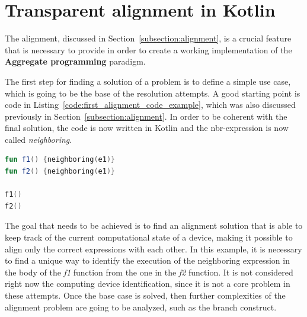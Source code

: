 \chapter{Transparent alignment in Kotlin}\label{chapter:alignment}
The alignment, discussed in Section~\ref{subsection:alignment}, is a crucial feature that is necessary to provide in order to create a working implementation of the \textbf{Aggregate programming} paradigm. 

The first step for finding a solution of a problem is to define a simple use case, which is going to be the base of the resolution attempts. A good starting point is code in Listing~\ref{code:first_alignment_code_example}, which was also discussed previously in Section~\ref{subsection:alignment}. In order to be coherent with the final solution, the code is now written in Kotlin and the nbr-expression is now called \textit{neighboring}.
\begin{lstlisting}[caption={Starting point code to resolve the alignment problem}, captionpos=b, language=Kotlin, label={code:first_alignment_code_example}]
fun f1() {neighboring(e1)}
fun f2() {neighboring(e1)}
        
f1()
f2()
\end{lstlisting}
The goal that needs to be achieved is to find an alignment solution that is able to keep track of the current computational state of a device, making it possible to align only the correct expressions with each other. In this example, it is necessary to find a unique way to identify the execution of the neighboring expression in the body of the \textit{f1} function from the one in the \textit{f2} function.\newline
It is not considered right now the computing device identification, since it is not a core problem in these attempts. Once the base case is solved, then further complexities of the alignment problem are going to be analyzed, such as the branch construct.

